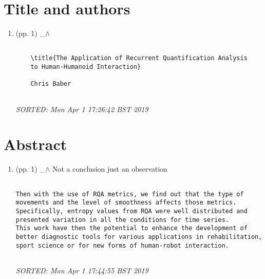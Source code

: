 \documentclass[12pt]{article}
\begin{document}
\maketitle


\begin{abstract}
This is a log book document for the corrections
of \emph{.../corrections/29-04-2019/comments/scanned-draft.pdf}.
\end{abstract}




\section{Title and authors}


\begin{enumerate}

\item  (pp. 1)  \_$\wedge$  

	\begin{verbatim}
	
	\title{The Application of Recurrent Quantification Analysis 
	to Human-Humanoid Interaction}

	Chris Baber 
	
	\end{verbatim}
	\textit{
	SORTED:  Mon Apr  1 17:26:42 BST 2019
	}
	\\


\end{enumerate}



\section{Abstract}


\begin{enumerate}

\item  (pp. 1)  \_$\wedge$  Not a conclusion just an observation

	\begin{verbatim}

Then with the use of RQA metrics, we find out that the type of 
movements and the level of smoothness affects those metrics. 
Specifically, entropy values from RQA were well distributed and 
presented variation in all the conditions for time series. 
This work have then the potential to enhance the development of 
better diagnostic tools for various applications in rehabilitation, 
sport science or for new forms of human-robot interaction.
	
	\end{verbatim}
	\textit{
	SORTED:  Mon Apr  1 17:44:55 BST 2019
	}
	\\


\end{enumerate}
\end{document}
